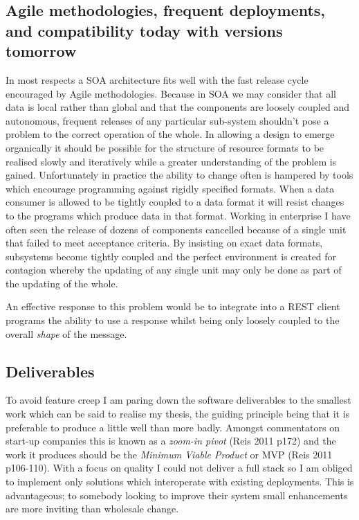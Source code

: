 \documentclass[12pt, ]{article}
\begin{document}
\subsection{Agile methodologies, frequent deployments, and compatibility
today with versions
tomorrow}\label{agile-methodologies-frequent-deployments-and-compatibility-today-with-versions-tomorrow}

In most respects a SOA architecture fits well with the fast release
cycle encouraged by Agile methodologies. Because in SOA we may consider
that all data is local rather than global and that the components are
loosely coupled and autonomous, frequent releases of any particular
sub-system shouldn't pose a problem to the correct operation of the
whole. In allowing a design to emerge organically it should be possible
for the structure of resource formats to be realised slowly and
iteratively while a greater understanding of the problem is gained.
Unfortunately in practice the ability to change often is hampered by
tools which encourage programming against rigidly specified formats.
When a data consumer is allowed to be tightly coupled to a data format
it will resist changes to the programs which produce data in that
format. Working in enterprise I have often seen the release of dozens of
components cancelled because of a single unit that failed to meet
acceptance criteria. By insisting on exact data formats, subsystems
become tightly coupled and the perfect environment is created for
contagion whereby the updating of any single unit may only be done as
part of the updating of the whole.

An effective response to this problem would be to integrate into a REST
client programs the ability to use a response whilst being only loosely
coupled to the overall \emph{shape} of the message.

\subsection{Deliverables}\label{deliverables}

To avoid feature creep I am paring down the software deliverables to the
smallest work which can be said to realise my thesis, the guiding
principle being that it is preferable to produce a little well than more
badly. Amongst commentators on start-up companies this is known as a
\emph{zoom-in pivot} (Reis 2011 p172) and the work it produces should be
the \emph{Minimum Viable Product} or MVP (Reis 2011 p106-110). With a
focus on quality I could not deliver a full stack so I am obliged to
implement only solutions which interoperate with existing deployments.
This is advantageous; to somebody looking to improve their system small
enhancements are more inviting than wholesale change.
\end{document}
